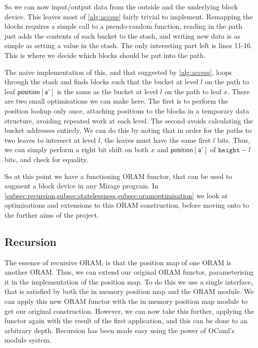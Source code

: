 \documentclass[12pt,a4paper,twoside,openright]{report}
\begin{document}
So we can now input/output data from the outside and the underlying block device. This leaves most of \cref{alg:access} fairly trivial to implement. Remapping the blocks requires a simple call to a pseudo-random function, reading in the path just adds the contents of each bucket to the stash, and writing new data is as simple as setting a value in the stash. The only interesting part left is lines 11-16. This is where we decide which blocks should be put into the path.

The naive implementation of this, and that suggested by \cref{alg:access}, loops through the stash and finds blocks such that the bucket at level $l$ on the path to leaf $\mathsf{position[a']}$ is the same as the bucket at level $l$ on the path to leaf $x$. There are two small optimisations we can make here. The first is to perform the position lookup only once, attaching positions to the blocks in a temporary data structure, avoiding repeated work at each level. The second avoids calculating the bucket addresses entirely. We can do this by noting that in order for the paths to two leaves to intersect at level $l$, the leaves must have the same first $l$ bits. Thus, we can simply perform a right bit shift on both $x$ and $\mathsf{position[a']}$ of $\mathtt{height} - l$ bits, and check for equality.

So at this point we have a functioning ORAM functor, that can be used to augment a block device in any Mirage program. In \cref{subsec:recursion,subsec:statelessness,subsec:oramoptimisation} we look at optimisations and extensions to this ORAM construction, before moving onto to the further aims of the project.


\subsection{Recursion}
\label{subsec:recursion}

The essence of recursive ORAM, is that the position map of one ORAM is another ORAM. Thus, we can extend our original ORAM functor, parameterising it in the implementation of the position map. To do this we use a single interface, that is satisfied by both the in memory position map and the ORAM module. We can apply this new ORAM functor with the in memory position map module to get our original construction. However, we can now take this further, applying the functor again with the result of the first application, and this can be done to an arbitrary depth. Recursion has been made easy using the power of OCaml's module system.
\end{document}
